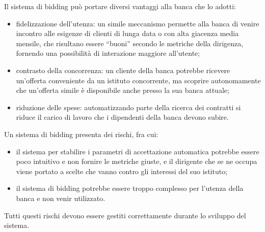 Il sistema di bidding pu\`o portare diversi vantaggi alla banca che lo adotti:
\begin{itemize}
	\item fidelizzazione dell'utenza: un simile meccanismo permette alla banca di venire incontro alle esigenze di clienti di lunga data o con alta giacenza media mensile, che risultano essere ``buoni'' secondo le metriche della dirigenza, fornendo una possibilit\`a di interazione maggiore all'utente;
	\item contrasto della concorrenza: un cliente della banca potrebbe ricevere un'offerta conveniente da un istituto concorrente, ma scoprire autonomamente che un'offerta simile \`e disponibile anche presso la sua banca attuale;
	\item riduzione delle spese: automatizzando parte della ricerca dei contratti si riduce il carico di lavoro che i dipendenti della banca devono subire.
\end{itemize}

Un sistema di bidding presenta dei rischi, fra cui:
\begin{itemize}
	\item il sistema per stabilire i parametri di accettazione automatica potrebbe essere poco intuitivo e non fornire le metriche giuste, e il dirigente che se ne occupa viene portato a scelte che vanno contro gli interessi del suo istituto;
	\item il sistema di bidding potrebbe essere troppo complesso per l'utenza della banca e non venir utilizzato.
\end{itemize}
Tutti questi rischi devono essere gestiti correttamente durante lo sviluppo del sistema.


